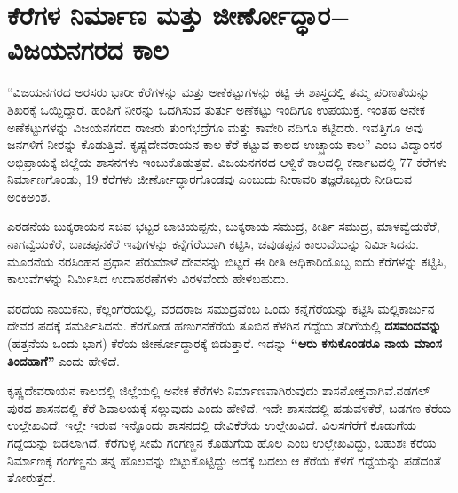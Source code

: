 \section*{ಕೆರೆಗಳ ನಿರ್ಮಾಣ ಮತ್ತು ಜೀರ್ಣೋದ್ಧಾರ$-$ವಿಜಯನಗರದ ಕಾಲ}

“ವಿಜಯನಗರದ ಅರಸರು ಭಾರೀ ಕೆರೆಗಳನ್ನು ಮತ್ತು ಅಣೆಕಟ್ಟುಗಳನ್ನು ಕಟ್ಟಿ ಈ ಶಾಸ್ತ್ರದಲ್ಲಿ ತಮ್ಮ ಪರಿಣತೆಯನ್ನು ಶಿಖರಕ್ಕೆ ಒಯ್ದಿದ್ದಾರೆ. ಹಂಪಿಗೆ ನೀರನ್ನು ಒದಗಿಸುವ ತುರ್ತು ಅಣೆಕಟ್ಟು ಇಂದಿಗೂ ಉಪಯುಕ್ತ. ಇಂತಹ ಅನೇಕ ಅಣೆಕಟ್ಟುಗಳನ್ನು ವಿಜಯನಗರದ ರಾಜರು ತುಂಗಭದ್ರೆಗೂ ಮತ್ತು ಕಾವೇರಿ ನದಿಗೂ ಕಟ್ಟಿದರು. ಇವತ್ತಿಗೂ ಅವು ಜನಗಳಿಗೆ ನೀರನ್ನು ಕೊಡುತ್ತಿವೆ. ಕೃಷ್ಣದೇವರಾಯನ ಕಾಲ ಕೆರೆ ಕಟ್ಟುವ ಕಾಲದ ಉಚ್ಛ್ರಾಯ ಕಾಲ” ಎಂಬ ವಿದ್ವಾಂಸರ ಅಭಿಪ್ರಾಯಕ್ಕೆ ಜಿಲ್ಲೆಯ ಶಾಸನಗಳು ಇಂಬುಕೊಡುತ್ತವೆ. ವಿಜಯನಗರದ ಆಳ್ವಿಕೆ ಕಾಲದಲ್ಲಿ ಕರ್ನಾಟದಲ್ಲಿ 77 ಕೆರೆಗಳು ನಿರ್ಮಾಣಗೊಂಡು, 19 ಕೆರೆಗಳು ಜೀರ್ಣೋದ್ಧಾರಗೊಂಡವು ಎಂಬುದು ನೀರಾವರಿ ತಜ್ಞರೊಬ್ಬರು ನೀಡಿರುವ ಅಂಕಿಅಂಶ.

ಎರಡನೆಯ ಬುಕ್ಕರಾಯನ ಸಚಿವ ಭಟ್ಟರ ಬಾಚಿಯಪ್ಪನು, ಬುಕ್ಕರಾಯ ಸಮುದ್ರ, ಕೀರ್ತಿ ಸಮುದ್ರ, ಮಾಳವ್ವೆಯಕೆರೆ, ನಾಗವ್ವೆಯಕೆರೆ, ಬಾಚಪ್ಪನಕೆರೆ ಇವುಗಳನ್ನು ಕನ್ನೆಗೆರೆಯಾಗಿ ಕಟ್ಟಿಸಿ, ಚವುಡಪ್ಪನ ಕಾಲುವೆಯನ್ನು ನಿರ್ಮಿಸಿದನು. ಮೂರನೆಯ ನರಸಿಂಹನ ಪ್ರಧಾನ ಪೆರುಮಾಳೆ ದೇವನನ್ನು ಬಿಟ್ಟರೆ ಈ ರೀತಿ ಅಧಿಕಾರಿಯೊಬ್ಬ ಐದು ಕೆರೆಗಳನ್ನು ಕಟ್ಟಿಸಿ, ಕಾಲುವೆಗಳನ್ನು ನಿರ್ಮಿಸಿದ ಉದಾಹರಣೆಗಳು ವಿರಳವೆಂದು ಹೇಳಬಹುದು.

ವರದೆಯ ನಾಯಕನು, ಕೆಲ್ಲಂಗೆರೆಯಲ್ಲಿ, ವರದರಾಜ ಸಮುದ್ರವೆಂಬ ಒಂದು ಕನ್ನೆಗೆರೆಯನ್ನು ಕಟ್ಟಿಸಿ ಮಲ್ಲಿಕಾರ್ಜುನ ದೇವರ ಪದಕ್ಕೆ ಸಮರ್ಪಿಸಿದನು. ಕೆರಗೋಡ ಹಣುಗನಕೆರೆಯ ತೂಬಿನ ಕೆಳಗಿನ ಗದ್ದೆಯ ತೆರಿಗೆಯಲ್ಲಿ \textbf{ದಸವಂದವನ್ನು} (ಹತ್ತನೆಯ ಒಂದು ಭಾಗ) ಕೆರೆಯ ಜೀರ್ಣೋದ್ಧಾರಕ್ಕೆ ಬಿಡುತ್ತಾರೆ. ಇದನ್ನು \textbf{“ಆರು ಕಸುಕೊಂಡರೂ ನಾಯ ಮಾಂಸ ತಿಂದಹಾಗೆ” }ಎಂದು ಹೇಳಿದೆ.

\newpage

ಕೃಷ್ಣದೇವರಾಯನ ಕಾಲದಲ್ಲಿ ಜಿಲ್ಲೆಯಲ್ಲಿ ಅನೇಕ ಕೆರೆಗಳು ನಿರ್ಮಾಣವಾಗಿರುವುದು ಶಾಸನೋಕ್ತವಾಗಿವೆ.\break ನಡಗಲ್​ಪುರದ ಶಾಸನದಲ್ಲಿ ಕೆರೆ ಶಿವಾಲಯಕ್ಕೆ ಸಲ್ಲುವುದು ಎಂದು ಹೇಳಿದೆ. ಇದೇ ಶಾಸನದಲ್ಲಿ ಹಡುವಳಕೆರೆ, ಬಡಗಣ ಕೆರೆಯ ಉಲ್ಲೇಖವಿದೆ. ಇಲ್ಲೇ ಇರುವ ಇನ್ನೊಂದು ಶಾಸನದಲ್ಲಿ ದೇವಿಕೆರೆಯ ಉಲ್ಲೇಖವಿದೆ. ವಿಲಸಗೆರೆಗೆ ಕೊಡುಗೆಯ ಗದ್ದೆಯನ್ನು ಬಿಡಲಾಗಿದೆ. ಕೆರೆಗುಳ್ಳ ಸೀಮೆ ಗಂಗಣ್ಣನ ಕೊಡುಗೆಯ ಹೊಲ ಎಂಬ ಉಲ್ಲೇಖವಿದ್ದು, ಬಹುಶಃ ಕೆರೆಯ ನಿರ್ಮಾಣಕ್ಕೆ ಗಂಗಣ್ಣನು ತನ್ನ ಹೊಲವನ್ನು ಬಿಟ್ಟುಕೊಟ್ಟಿದ್ದು ಅದಕ್ಕೆ ಬದಲು ಆ ಕೆರೆಯ ಕೆಳಗೆ ಗದ್ದೆಯನ್ನು ಪಡೆದಂತೆ ತೋರುತ್ತದೆ.

